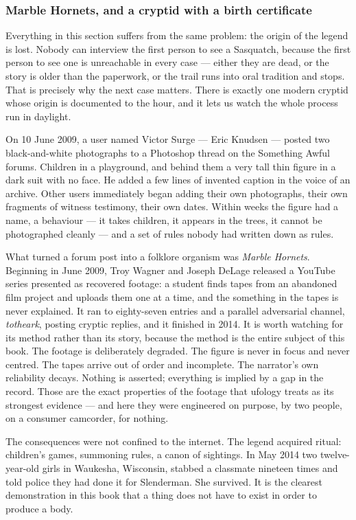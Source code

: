 \subsubsection*{Marble Hornets, and a cryptid with a birth certificate}

Everything in this section suffers from the same problem: the origin of the legend is lost. Nobody
can interview the first person to see a Sasquatch, because the first person to see one is
unreachable in every case --- either they are dead, or the story is older than the paperwork, or
the trail runs into oral tradition and stops. That is precisely why the next case matters. There
is exactly one modern cryptid whose origin is documented to the hour, and it lets us watch the
whole process run in daylight.

On 10 June 2009, a user named Victor Surge --- Eric Knudsen --- posted two black-and-white
photographs to a Photoshop thread on the Something Awful forums. Children in a playground, and
behind them a very tall thin figure in a dark suit with no face. He added a few lines of invented
caption in the voice of an archive. Other users immediately began adding their own photographs,
their own fragments of witness testimony, their own dates. Within weeks the figure had a name, a
behaviour --- it takes children, it appears in the trees, it cannot be photographed cleanly ---
and a set of rules nobody had written down as rules.

What turned a forum post into a folklore organism was \emph{Marble Hornets}. Beginning in June
2009, Troy Wagner and Joseph DeLage released a YouTube series presented as recovered footage: a
student finds tapes from an abandoned film project and uploads them one at a time, and the
something in the tapes is never explained. It ran to eighty-seven entries and a parallel
adversarial channel, \emph{totheark}, posting cryptic replies, and it finished in 2014. It is
worth watching for its method rather than its story, because the method is the entire subject of
this book. The footage is deliberately degraded. The figure is never in focus and never centred.
The tapes arrive out of order and incomplete. The narrator's own reliability decays. Nothing is
asserted; everything is implied by a gap in the record. Those are the exact properties of the
footage that ufology treats as its strongest evidence --- and here they were engineered on
purpose, by two people, on a consumer camcorder, for nothing.

The consequences were not confined to the internet. The legend acquired ritual: children's games,
summoning rules, a canon of sightings. In May 2014 two twelve-year-old girls in Waukesha,
Wisconsin, stabbed a classmate nineteen times and told police they had done it for Slenderman. She
survived. It is the clearest demonstration in this book that a thing does not have to exist in
order to produce a body.

